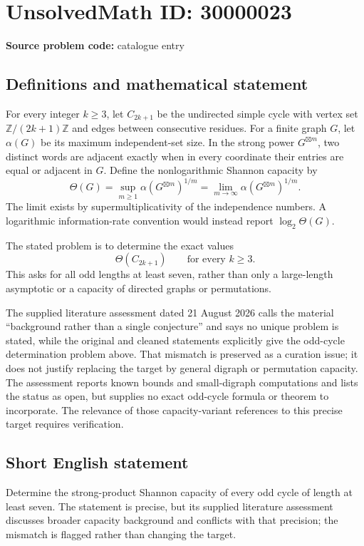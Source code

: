 \documentclass[11pt]{article}
\newcommand{\Z}{\mathbb{Z}}
\begin{document}
\section*{UnsolvedMath ID: 30000023}
\textbf{Source problem code:} catalogue entry
\subsection{Definitions and mathematical statement}
For every integer \(k\geq3\), let \(C_{2k+1}\) be the undirected simple cycle with vertex set \(\Z/(2k+1)\Z\) and edges between consecutive residues. For a finite graph \(G\), let \(\alpha(G)\) be its maximum independent-set size. In the strong power \(G^{\boxtimes m}\), two distinct words are adjacent exactly when in every coordinate their entries are equal or adjacent in \(G\). Define the nonlogarithmic Shannon capacity by
\[
 \Theta(G)=\sup_{m\geq1}\alpha(G^{\boxtimes m})^{1/m}
 =\lim_{m\to\infty}\alpha(G^{\boxtimes m})^{1/m}.
\]
The limit exists by supermultiplicativity of the independence numbers. A logarithmic information-rate convention would instead report \(\log_2\Theta(G)\).

The stated problem is to determine the exact values
\[
 \Theta(C_{2k+1})\qquad\text{for every }k\geq3.
\]
This asks for all odd lengths at least seven, rather than only a large-length asymptotic or a capacity of directed graphs or permutations.

The supplied literature assessment dated 21 August 2026 calls the material ``background rather than a single conjecture'' and says no unique problem is stated, while the original and cleaned statements explicitly give the odd-cycle determination problem above. That mismatch is preserved as a curation issue; it does not justify replacing the target by general digraph or permutation capacity. The assessment reports known bounds and small-digraph computations and lists the status as open, but supplies no exact odd-cycle formula or theorem to incorporate. The relevance of those capacity-variant references to this precise target requires verification.
\subsection{Short English statement}
Determine the strong-product Shannon capacity of every odd cycle of length at least seven. The statement is precise, but its supplied literature assessment discusses broader capacity background and conflicts with that precision; the mismatch is flagged rather than changing the target.
\end{document}
